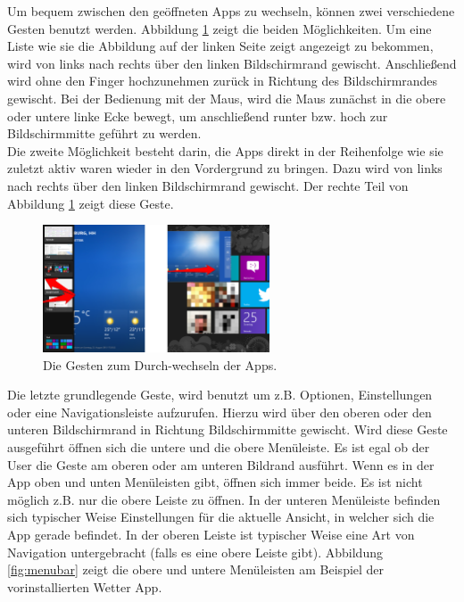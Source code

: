 \documentclass[12pt,a4paper,bibtotoc]{scrartcl}
\begin{document}
Um bequem zwischen den geöffneten Apps zu wechseln, können zwei verschiedene Gesten benutzt werden. Abbildung \ref{fig:appschanging} zeigt die beiden Möglichkeiten. Um eine Liste wie sie die Abbildung auf der linken Seite zeigt angezeigt zu bekommen, wird von links nach rechts über den linken Bildschirmrand gewischt. Anschließend wird ohne den Finger hochzunehmen zurück in Richtung des Bildschirmrandes gewischt. Bei der Bedienung mit der Maus, wird die Maus zunächst in die obere oder untere linke Ecke bewegt, um anschließend runter bzw. hoch zur Bildschirmmitte geführt zu werden.\\
Die zweite Möglichkeit besteht darin, die Apps direkt in der Reihenfolge wie sie zuletzt aktiv waren wieder in den Vordergrund zu bringen. Dazu wird von links nach rechts über den linken Bildschirmrand gewischt. Der rechte Teil von Abbildung \ref{fig:appschanging} zeigt diese Geste.
 
\begin{figure}[h]	
	\centering
	\includegraphics[width=0.6\textwidth]{Bilder/Screenshots/windows8/apps_changing.png} 
	\caption{Die Gesten zum Durch-wechseln der Apps.}
	\label{fig:appschanging}
\end{figure}  

Die letzte grundlegende Geste, wird benutzt um z.B. Optionen, Einstellungen oder eine Navigationsleiste aufzurufen. Hierzu wird über den oberen oder den unteren Bildschirmrand in Richtung Bildschirmmitte gewischt. Wird diese Geste ausgeführt öffnen sich die untere und die obere Menüleiste. Es ist egal ob der User die Geste am oberen oder am unteren Bildrand ausführt. Wenn es in der App oben und unten Menüleisten gibt, öffnen sich immer beide. Es ist nicht möglich z.B. nur die obere Leiste zu öffnen. In der unteren Menüleiste befinden sich typischer Weise Einstellungen für die aktuelle Ansicht, in welcher sich die App gerade befindet. In der oberen Leiste ist typischer Weise eine Art von Navigation untergebracht (falls es eine obere Leiste gibt). Abbildung \ref{fig:menubar} zeigt die obere und untere Menüleisten am Beispiel der vorinstallierten Wetter App.
\end{document}
